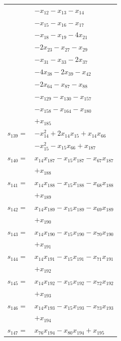 \begin{longtable}{@{}r@{\;}l@{}}
 & \(\displaystyle -x_{12} -x_{13} -x_{14}\) \\
 & \(\displaystyle -x_{15} -x_{16} -x_{17}\) \\
 & \(\displaystyle -x_{18} -x_{19} -4x_{21}\) \\
 & \(\displaystyle -2x_{23} -x_{27} -x_{29}\) \\
 & \(\displaystyle -x_{31} -x_{33} -2x_{37}\) \\
 & \(\displaystyle -4x_{38} -2x_{39} -x_{42}\) \\
 & \(\displaystyle -2x_{64} -x_{87} -x_{88}\) \\
 & \(\displaystyle -x_{129} -x_{130} -x_{157}\) \\
 & \(\displaystyle -x_{158} -x_{164} -x_{180}\) \\
 & \(\displaystyle +x_{185}\) \\[3pt]
\(s_{139}=\) & \(\displaystyle -x_{14}^{2} +2x_{14}x_{15} +x_{14}x_{66}\) \\
 & \(\displaystyle -x_{15}^{2} -x_{15}x_{66} +x_{187}\) \\[3pt]
\(s_{140}=\) & \(\displaystyle x_{14}x_{187} -x_{15}x_{187} -x_{67}x_{187}\) \\
 & \(\displaystyle +x_{188}\) \\[3pt]
\(s_{141}=\) & \(\displaystyle x_{14}x_{188} -x_{15}x_{188} -x_{68}x_{188}\) \\
 & \(\displaystyle +x_{189}\) \\[3pt]
\(s_{142}=\) & \(\displaystyle x_{14}x_{189} -x_{15}x_{189} -x_{69}x_{189}\) \\
 & \(\displaystyle +x_{190}\) \\[3pt]
\(s_{143}=\) & \(\displaystyle x_{14}x_{190} -x_{15}x_{190} -x_{70}x_{190}\) \\
 & \(\displaystyle +x_{191}\) \\[3pt]
\(s_{144}=\) & \(\displaystyle x_{14}x_{191} -x_{15}x_{191} -x_{71}x_{191}\) \\
 & \(\displaystyle +x_{192}\) \\[3pt]
\(s_{145}=\) & \(\displaystyle x_{14}x_{192} -x_{15}x_{192} -x_{72}x_{192}\) \\
 & \(\displaystyle +x_{193}\) \\[3pt]
\(s_{146}=\) & \(\displaystyle x_{14}x_{193} -x_{15}x_{193} -x_{73}x_{193}\) \\
 & \(\displaystyle +x_{194}\) \\[3pt]
\(s_{147}=\) & \(\displaystyle x_{76}x_{194} -x_{80}x_{194} +x_{195}\) \\[3pt]

\end{longtable}
